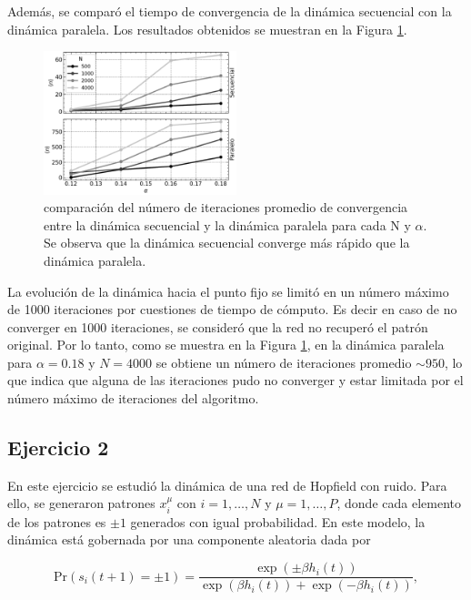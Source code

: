 \documentclass[11pt, twocolumn]{article}
\begin{document}
Además, se comparó el tiempo de convergencia de la dinámica secuencial con la dinámica paralela. Los resultados obtenidos se muestran en la Figura \ref{fig:ej1_time}.

\begin{figure} [htbp]
    \centering
    \includegraphics[width=0.5\textwidth]{figures/overlap_vs_alpha.pdf}
    \caption{comparación del número de iteraciones promedio de convergencia entre la dinámica secuencial y la dinámica paralela para cada N y \(\alpha\). Se observa que la dinámica secuencial converge más rápido que la dinámica paralela.}
    \label{fig:ej1_time}
\end{figure}

La evolución de la dinámica hacia el punto fijo se limitó en un número máximo de 1000 iteraciones por cuestiones de tiempo de cómputo. Es decir en caso de no converger en 1000 iteraciones, se consideró que la red no recuperó el patrón original. Por lo tanto, como se muestra en la Figura \ref{fig:ej1_time}, en la dinámica paralela para \(\alpha = 0.18\) y \(N = 4000\) se obtiene un número de iteraciones promedio \(\sim 950\), lo que indica que alguna de las iteraciones pudo no converger y estar limitada por el número máximo de iteraciones del algoritmo.



\subsection*{Ejercicio 2}
En este ejercicio se estudió la dinámica de una red de Hopfield con ruido. Para ello, se generaron patrones \(x_i^\mu\) con \(i = 1, \ldots, N\) y \(\mu = 1, \ldots, P\), donde cada elemento de los patrones es \(\pm 1\) generados con igual probabilidad. En este modelo, la dinámica está gobernada por una componente aleatoria dada por

\begin{equation} \nonumber
    \text{Pr}(s_i(t+1) = \pm 1) = \frac{\exp(\pm \beta h_i(t))}{\exp(\beta h_i(t)) + \exp(-\beta h_i(t))},
\end{equation}
\end{document}

